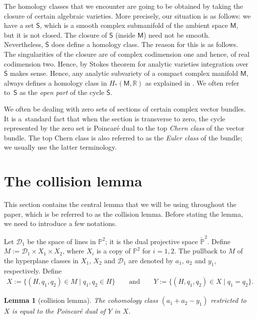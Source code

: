 \documentclass[pdftex]{sigma}
\numberwithin{equation}{section}
\newtheorem{lmm}[thm]{Lemma}
\begin{document}
The homology classes that we encounter are going to be obtained
by taking the closure of certain algebraic varieties. More precisely,
our situation is as follows: we have a set $\mathsf{S}$, which is
a smooth complex submanifold of the ambient space $\mathsf{M}$, but it is
not closed. The closure of $\mathsf{S}$ (inside $\mathsf{M}$)
need not be smooth. Nevertheless, $\overline{\mathsf{S}}$ does define a homology class.
The reason for this is as follows. The singularities of the closure are of
complex codimension one and hence, of real codimension two. Hence, by Stokes theorem
for analytic varieties
\cite[p.~33]{GH3}
integration over $\overline{\mathsf{S}}$ makes sense.
Hence, any analytic subvariety of a compact complex manifold $\mathsf{M}$, always
defines a homology class in $H_*(\mathsf{M}, \mathbb{R})$ as explained in
\cite[pp.~33 and 61]{GH3}. We often refer to~$\mathsf{S}$ as the
\emph{open part} of the cycle $\overline{\mathsf{S}}$.

We often be dealing with zero sets of sections of certain complex vector bundles.
It is a~standard fact that when the section is transverse to zero, the cycle represented
by the zero set is Poincar\'{e} dual to the top \emph{Chern class} of the vector bundle.
The top Chern class is also referred to as the \emph{Euler class} of the bundle; we
usually use the latter terminology.

\section{The collision lemma}
\label{coll_lemm}

This section contains the central lemma that we will be using throughout the paper, which is
be referred to as the collision lemma. Before stating the lemma, we need to introduce a few notations.

Let $\mathcal{D}_1$ be the space of lines in $\mathbb{P}^2$; it is the dual projective space $\check{\mathbb{P}}^2$. Define
$
M := \mathcal{D}_1 \times X_{1} \times X_{2}$,
where $X_i$ is a copy of $\mathbb{P}^2$ for $i = 1, 2$.
The pullback to $M$ of the hyperplane classes in
$X_{1}$, $X_{2}$ and $\mathcal{D}_1$ are denoted by $a_1$, $a_2$ and $y_1$, respectively. Define
\begin{align*}
X := \{ (H, q_1, q_2) \in M  \mid  q_1, q_2 \in H\}
\qquad \text{and}
\qquad
Y := \{ (H, q_1, q_2) \in X  \mid  q_1= q_2\}.
\end{align*}
\begin{lmm}[{collision lemma}]\label{CL_ver2}
The cohomology class $(a_1+a_2-y_1)$ restricted to $X$ is equal to
the Poincar\'{e} dual of $Y$ in $X$.
\end{lmm}
\end{document}
